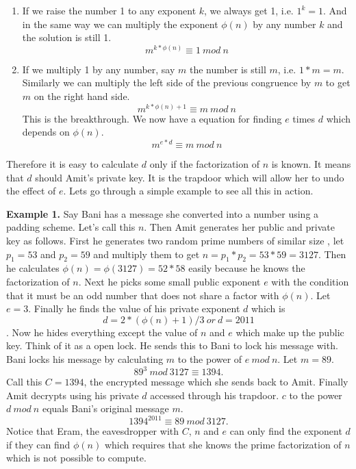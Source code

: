 \documentclass[12pt]{article}
\begin{document}
\begin{enumerate}
\item If we raise the number 1 to any exponent $k$, we always get 1, i.e. $1^k =1$. And in the same way we can multiply the exponent $\phi(n)$ by any number $k$ and the solution is still 1. $$m^{k*\phi(n)} \equiv 1 \: mod \: n$$

\item If we multiply 1 by any number, say $m$ the number is still $m$, i.e. $1*m=m$. Similarly we can multiply the left side of the previous congruence by $m$ to get $m$ on the right hand side. $$m^{k*\phi(n)+1} \equiv m \: mod \: n$$
This is the breakthrough. We now have a equation for finding $e$ times $d$ which depends on $\phi(n)$. $$m^{e*d} \equiv m \: mod \: n$$

\end{enumerate}
Therefore it is easy to calculate $d$ only if the factorization of $n$ is known. It means that $d$ should Amit's private key. It is the trapdoor which will allow her to undo the effect of $e$. Lets go through a simple example to see all this in action.

\textbf{Example 1.} Say Bani has a message she converted into a number using a padding scheme. Let's call this $n$. Then Amit generates her public and private key as follows. First he generates two random prime numbers of similar size , let $p_1 =53$ and $p_2 =59$ and multiply them to get $n= p_1 * p_2= 53*59=3127$. Then he calculates $\phi(n)=\phi(3127)=52*58$ easily because he knows the factorization of $n$. Next he picks some small public exponent $e$ with the condition that it must be an odd number that does not share a factor with $\phi(n)$. Let $e=3$. Finally he finds the value of his private exponent $d$ which is $$d=2*(\phi(n)+1)/3 \: or \: d=2011$$.
Now he hides everything except  the value of $n$ and $e$ which make up the public key. Think of it as a open lock. He sends this to Bani to lock his message with. Bani locks his message by calculating $m$ to the power of $e\: mod \: n$. Let $m=89$. $$89^3 \: mod \: 3127 \equiv 1394.$$  Call this $C=1394$, the encrypted message which she sends back to Amit. Finally Amit decrypts  using his private $d$ accessed through his trapdoor. $c$ to the power $d \: mod \: n$ equals Bani's original message $m$.
$$1394^2011 \equiv 89 \: mod \: 3127.$$
Notice that Eram, the eavesdropper with $C$, $n$ and $e$ can only find the exponent $d$ if they can find $\phi(n)$ which requires that she knows the prime factorization of $n$ which is not possible to compute.
\end{document}
